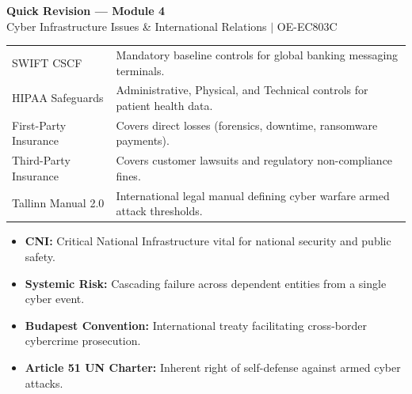 \documentclass[12pt,a4paper]{article}
\renewcommand{\arraystretch}{1.45}
\begin{document}
\newpage
\begin{center}
  {\large\bfseries\color{myred} Quick Revision --- Module 4}\\[3pt]
  {\small\color{mydark} Cyber Infrastructure Issues \& International Relations $|$ OE-EC803C}
\end{center}
\noindent{\color{myred}\rule{\linewidth}{1.2pt}}
\vspace{4pt}

\begin{tcolorbox}[formulabox, title={\textbf{Key Concepts and Metrics at a Glance}}]
\renewcommand{\arraystretch}{1.35}
\begin{tabularx}{\linewidth}{B{4.8cm} X}
SWIFT CSCF & Mandatory baseline controls for global banking messaging terminals. \\[3pt]
HIPAA Safeguards & Administrative, Physical, and Technical controls for patient health data. \\[3pt]
First-Party Insurance & Covers direct losses (forensics, downtime, ransomware payments). \\[3pt]
Third-Party Insurance & Covers customer lawsuits and regulatory non-compliance fines. \\[3pt]
Tallinn Manual 2.0 & International legal manual defining cyber warfare armed attack thresholds.
\end{tabularx}
\end{tcolorbox}

\begin{tcolorbox}[defbox, title={\textbf{One-Line Definitions}}]
\begin{itemize}[leftmargin=*, itemsep=2pt, topsep=0pt]
  \item \textbf{CNI:} Critical National Infrastructure vital for national security and public safety.
  \item \textbf{Systemic Risk:} Cascading failure across dependent entities from a single cyber event.
  \item \textbf{Budapest Convention:} International treaty facilitating cross-border cybercrime prosecution.
  \item \textbf{Article 51 UN Charter:} Inherent right of self-defense against armed cyber attacks.
\end{itemize}
\end{tcolorbox}
\end{document}
